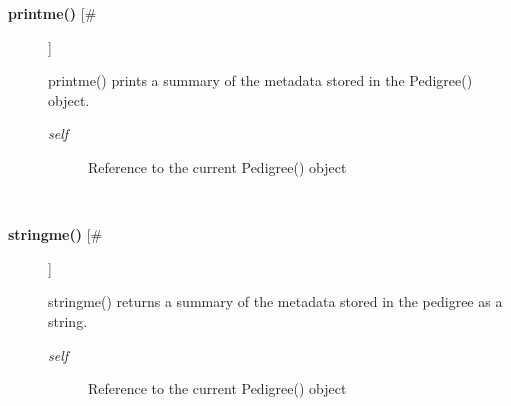 \documentclass{article}
\begin{document}
\begin{description}
\item[\textbf{printme()} [\#]
]
\par printme() prints a summary of the metadata stored in the Pedigree() object.
\begin{description}
\item[\textit{self}
]
Reference to the current Pedigree() object
\end{description}\\

\item[\textbf{stringme()} [\#]
]
\par stringme() returns a summary of the metadata stored in the pedigree as
a string.
\begin{description}
\item[\textit{self}
]
Reference to the current Pedigree() object
\end{description}\\

\end{description}
\end{document}
